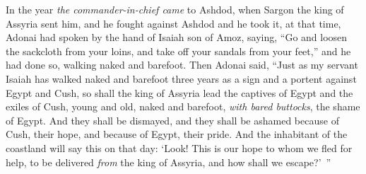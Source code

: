 \begin{biblechapter} %
 In the year \textit{the commander-in-chief came} to Ashdod, when Sargon the king of Assyria sent him, and he fought against Ashdod and he took it,
\verse at that time, Adonai had spoken by the hand of Isaiah son of Amoz, saying, “Go and loosen the sackcloth from your loins, 
and take off your sandals from your feet,” and he had done so, walking naked and barefoot.
\verse Then Adonai said, “Just as my servant Isaiah has walked naked and barefoot three years as a sign and a portent against Egypt and Cush,
\verse so shall the king of Assyria lead the captives of Egypt and the exiles of Cush, young and old, naked and barefoot, \textit{with bared buttocks}, the shame of Egypt.
\verse And they shall be dismayed, 
and they shall be ashamed 
because of Cush, their hope, 
and because of Egypt, their pride.
\verse And the inhabitant of the coastland will say this on that day: ‘Look! This is our hope to whom we fled for help, to be delivered \textit{from} the king of Assyria, and how shall we escape?’ ”
\end{biblechapter}

